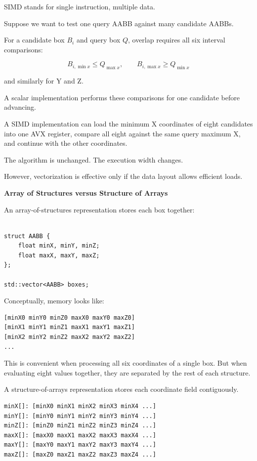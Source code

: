 SIMD stands for single instruction, multiple data.

Suppose we want to test one query AABB against many candidate AABBs.

For a candidate box \(B_i\) and query box \(Q\), overlap requires all six interval comparisons:

\[
B_{i,\min x}\le Q_{\max x}, \qquad B_{i,\max x}\ge Q_{\min x}
\]

and similarly for Y and Z.

A scalar implementation performs these comparisons for one candidate before advancing.

A SIMD implementation can load the minimum X coordinates of eight candidates into one AVX register, compare all eight against the same query maximum X, and continue with the other coordinates.

The algorithm is unchanged. The execution width changes.

However, vectorization is effective only if the data layout allows efficient loads.

\textbf{Array of Structures versus Structure of Arrays}

An array-of-structures representation stores each box together:

\begin{verbatim}

struct AABB {
    float minX, minY, minZ;
    float maxX, maxY, maxZ;
};

std::vector<AABB> boxes;
\end{verbatim}

Conceptually, memory looks like:

\begin{verbatim}
[minX0 minY0 minZ0 maxX0 maxY0 maxZ0]
[minX1 minY1 minZ1 maxX1 maxY1 maxZ1]
[minX2 minY2 minZ2 maxX2 maxY2 maxZ2]
...
\end{verbatim}

This is convenient when processing all six coordinates of a single box. But when evaluating eight  values together, they are separated by the rest of each structure.

A structure-of-arrays representation stores each coordinate field contiguously.

\begin{verbatim}
minX[]: [minX0 minX1 minX2 minX3 minX4 ...]
minY[]: [minY0 minY1 minY2 minY3 minY4 ...]
minZ[]: [minZ0 minZ1 minZ2 minZ3 minZ4 ...]
maxX[]: [maxX0 maxX1 maxX2 maxX3 maxX4 ...]
maxY[]: [maxY0 maxY1 maxY2 maxY3 maxY4 ...]
maxZ[]: [maxZ0 maxZ1 maxZ2 maxZ3 maxZ4 ...]
\end{verbatim}

